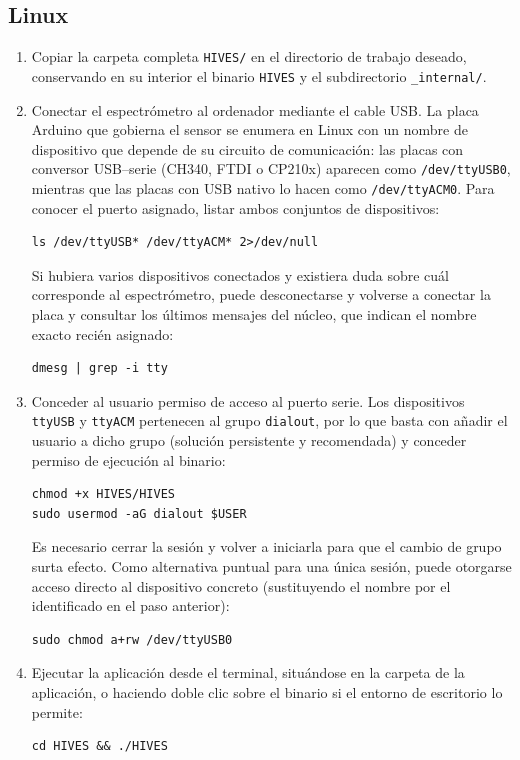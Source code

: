 \subsection*{Linux}
\begin{enumerate}
  \item Copiar la carpeta completa \texttt{HIVES/} en el directorio de trabajo
        deseado, conservando en su interior el binario \texttt{HIVES} y el
        subdirectorio \texttt{\_internal/}.
  \item Conectar el espectrómetro al ordenador mediante el cable USB. La placa
        Arduino que gobierna el sensor se enumera en Linux con un nombre de
        dispositivo que depende de su circuito de comunicación: las placas con
        conversor USB--serie (CH340, FTDI o CP210x) aparecen como
        \texttt{/dev/ttyUSB0}, mientras que las placas con USB nativo lo hacen como
        \texttt{/dev/ttyACM0}. Para conocer el puerto asignado, listar ambos
        conjuntos de dispositivos:
\begin{verbatim}
ls /dev/ttyUSB* /dev/ttyACM* 2>/dev/null
\end{verbatim}
        Si hubiera varios dispositivos conectados y existiera duda sobre cuál
        corresponde al espectrómetro, puede desconectarse y volverse a conectar la
        placa y consultar los últimos mensajes del núcleo, que indican el nombre
        exacto recién asignado:
\begin{verbatim}
dmesg | grep -i tty
\end{verbatim}
  \item Conceder al usuario permiso de acceso al puerto serie. Los dispositivos
        \texttt{ttyUSB} y \texttt{ttyACM} pertenecen al grupo \texttt{dialout}, por
        lo que basta con añadir el usuario a dicho grupo (solución persistente y
        recomendada) y conceder permiso de ejecución al binario:
\begin{verbatim}
chmod +x HIVES/HIVES
sudo usermod -aG dialout $USER
\end{verbatim}
        Es necesario cerrar la sesión y volver a iniciarla para que el cambio de
        grupo surta efecto. Como alternativa puntual para una única sesión, puede
        otorgarse acceso directo al dispositivo concreto (sustituyendo el nombre por
        el identificado en el paso anterior):
\begin{verbatim}
sudo chmod a+rw /dev/ttyUSB0
\end{verbatim}
  \item Ejecutar la aplicación desde el terminal, situándose en la carpeta de la
        aplicación, o haciendo doble clic sobre el binario si el entorno de
        escritorio lo permite:
\begin{verbatim}
cd HIVES && ./HIVES
\end{verbatim}
\end{enumerate}


